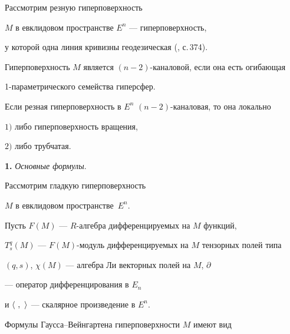 

\maketitle


\label{begin}





Рассмотрим резную гиперповерхность


$M$ в евклидовом пространстве $E^n$ --- гиперповерхность,


у которой одна линия кривизны геодезическая (\cite{1}, с.\,374).


Гиперповерхность $M$ является $(n-2)$-каналовой, если она есть огибающая


1-параметрического семейства гиперсфер.





\begin{thmnonum}


Если резная гиперповерхность в $E^n$\; $(n-2)$-каналовая, то она локально





$1)$ либо гиперповерхность вращения,





$2)$ либо трубчатая.


\end{thmnonum}








{\bf 1.} {\it Основные формулы}.


Рассмотрим гладкую гиперповерхность


$M$ в евклидовом пространстве~$E^{n}$.


Пусть $F(M)$ --- $R$-алгебра дифференцируемых на $M$ функций,


$T^q_s(M)$ --- $F(M)$-модуль дифференцируемых на $M$ тензорных полей типа


$(q,s)$, $\chi (M)$ --- алгебра Ли векторных полей на $M$, $\partial$


--- оператор дифференцирования в $E_n$


и $\langle\ ,\ \rangle$ --- скалярное произведение в $E^n$.





Формулы Гаусса--Вейнгартена гиперповерхности $M$ имеют вид


